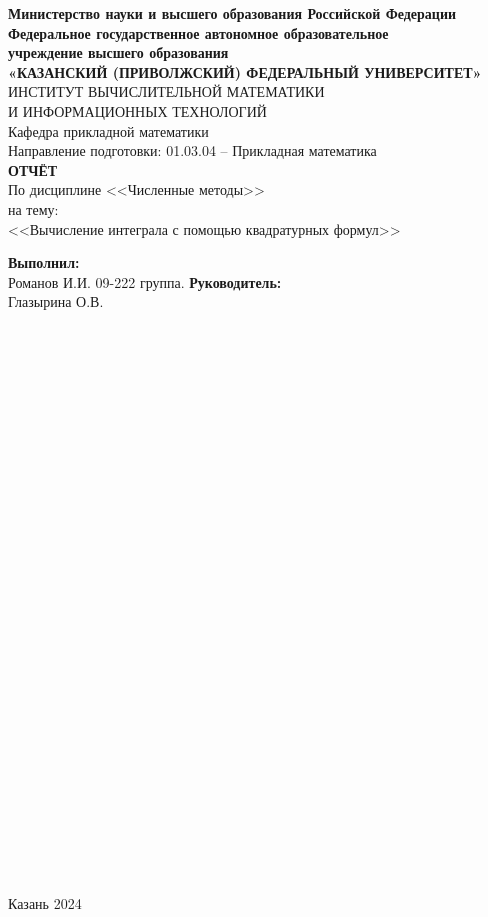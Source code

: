\documentclass[14pt]{article}
\begin{document}
\begin{center}
\hfill \break
\textbf{\normalsize{Министерство науки и высшего образования Российской Федерации\\
Федеральное государственное автономное образовательное\\
учреждение высшего образования}}
\\
\normalsize{\textbf{«КАЗАНСКИЙ (ПРИВОЛЖСКИЙ) ФЕДЕРАЛЬНЫЙ УНИВЕРСИТЕТ»}}\\
\hfill \break
\normalsize{ИНСТИТУТ ВЫЧИСЛИТЕЛЬНОЙ МАТЕМАТИКИ\\ И ИНФОРМАЦИОННЫХ ТЕХНОЛОГИЙ}\\
 \hfill \break
\normalsize{Кафедра прикладной математики}\\
\hfill\break
\hfill \break
\normalsize{Направление подготовки: 01.03.04 – Прикладная математика}\\
\hfill \break
\hfill \break
\textbf{ОТЧЁТ}\\
\normalsize{По дисциплине <<Численные методы>>}\\
\normalsize{на тему:}\\
\normalsize{<<Вычисление интеграла с помощью квадратурных формул>>}\\
\hfill \break
\hfill \break
\end{center}

\hfill \break
\textbf{Выполнил:}\\Романов И.И. 09-222 группа.
\hfill \break
\hfill \break
\textbf{Руководитель:}\\Глазырина О.В.
\\
\\
\\
\\
\\
\\
\\
\\
\\
\\
\\
\\
\\
\\
\\
\\
\\
\\
\\
\\
\\
\\
\\
\\
\\
\\
\\
\\
\\
\\
\begin{center} Казань 2024 \end{center}
\thispagestyle{empty}
 
\end{document}
